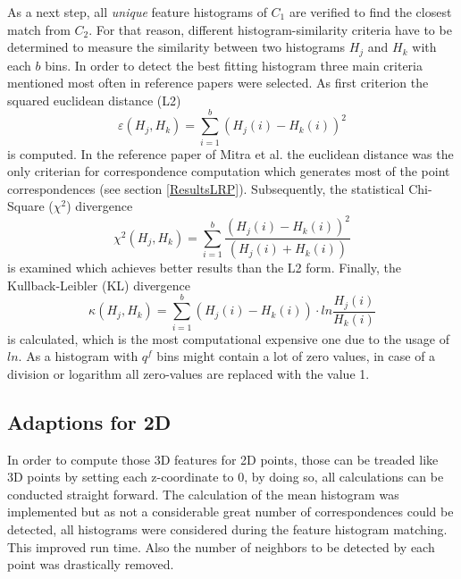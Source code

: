 As a next step, all \textit{unique} feature histograms of $C_1$ are verified to find the closest match from $C_2$. For that reason, different histogram-similarity criteria have to be determined to measure the similarity between two histograms $H_j$ and $H_k$ with each $b$ bins. In order to detect the best fitting histogram three main criteria mentioned most often in reference papers \cite{surfletPairRelation} \cite{localFeatureHistograms} were selected. As first criterion the squared euclidean distance (L2)
\begin{equation}
\varepsilon(H_j, H_k) = \displaystyle\sum_{i=1}^{b}(H_j(i) - H_k(i))^2
\end{equation}
is computed. In the reference paper of Mitra et al. \cite{Mitra07} the euclidean distance was the only criterian for correspondence computation which generates most of the point correspondences (see section \ref{ResultsLRP}). Subsequently, the statistical Chi-Square ($\chi^2$) divergence
\begin{equation}
\chi^2(H_j, H_k) = \displaystyle\sum_{i=1}^{b}\frac{(H_j(i) - H_k(i))^2}{(H_j(i) + H_k(i))}
\end{equation}
is examined which achieves better results than the L2 form. Finally, the Kullback-Leibler (KL) divergence
\begin{equation}
\kappa(H_j, H_k) = \displaystyle\sum_{i=1}^{b}(H_j(i) - H_k(i)) \cdot ln \frac{H_j(i)}{H_k(i)}
\end{equation}
is calculated, which is the most computational expensive one due to the usage of $ln$. As a histogram with $q^f$ bins might contain a lot of zero values, in case of a division or logarithm all zero-values are replaced with the value 1.

\subsection{Adaptions for 2D}
In order to compute those 3D features for 2D points, those can be treaded like 3D points by setting each z-coordinate to 0, by doing so, all calculations can be conducted straight forward. 
The calculation of the mean histogram was implemented but as not a considerable great number of correspondences could be detected, all histograms were considered during the feature histogram matching. This improved run time. Also the number of neighbors to be detected by each point was drastically removed. 


